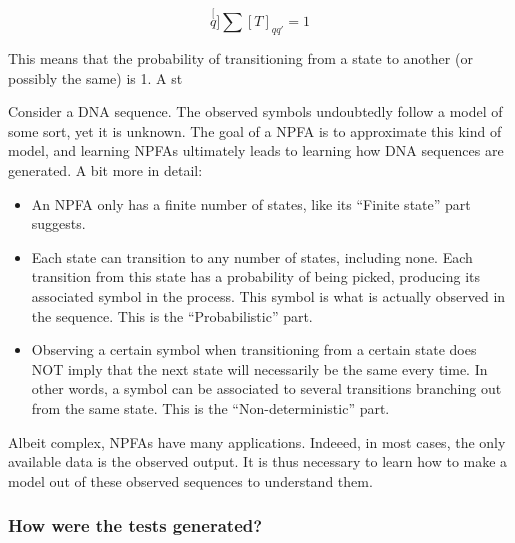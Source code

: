 \[
\stackrel[q]{}{\sum}[T]_{qq'}=1
\]


This means that the probability of transitioning from a state to another
(or possibly the same) is 1. A st

Consider a DNA sequence. The observed symbols undoubtedly follow a
model of some sort, yet it is unknown. The goal of a NPFA is to approximate
this kind of model, and learning NPFAs ultimately leads to learning
how DNA sequences are generated. A bit more in detail:
\begin{itemize}
\item An NPFA only has a finite number of states, like its ``Finite state''
part suggests.
\item Each state can transition to any number of states, including none.
Each transition from this state has a probability of being picked,
producing its associated symbol in the process. This symbol is what
is actually observed in the sequence. This is the ``Probabilistic''
part.
\item Observing a certain symbol when transitioning from a certain state
does NOT imply that the next state will necessarily be the same every
time. In other words, a symbol can be associated to several transitions
branching out from the same state. This is the ``Non-deterministic''
part.
\end{itemize}
Albeit complex, NPFAs have many applications. Indeeed, in most cases,
the only available data is the observed output. It is thus necessary
to learn how to make a model out of these observed sequences to understand
them.


\subsubsection{How were the tests generated?}

